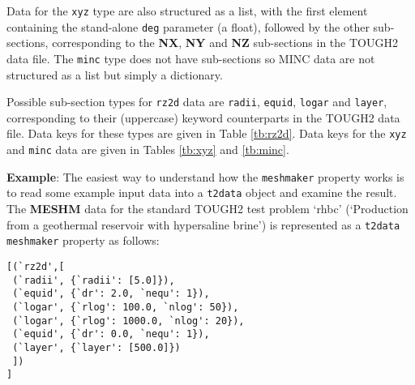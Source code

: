Data for the \texttt{xyz} type are also structured as a list, with the first element containing the stand-alone \texttt{deg} parameter (a float), followed by the other sub-sections, corresponding to the \textbf{NX}, \textbf{NY} and \textbf{NZ} sub-sections in the TOUGH2 data file.  The \texttt{minc} type does not have sub-sections so MINC data are not structured as a list but simply a dictionary.

Possible sub-section types for \texttt{rz2d} data are \texttt{radii}, \texttt{equid}, \texttt{logar} and \texttt{layer}, corresponding to their (uppercase) keyword counterparts in the TOUGH2 data file.  Data keys for these types are given in Table \ref{tb:rz2d}.  Data keys for the \texttt{xyz} and \texttt{minc} data are given in Tables \ref{tb:xyz} and \ref{tb:minc}.

\textbf{Example}: The easiest way to understand how the \texttt{meshmaker} property works is to read some example input data into a \texttt{t2data} object and examine the result.  The \textbf{MESHM} data for the standard TOUGH2 test problem `rhbc' (`Production from a geothermal reservoir with hypersaline brine') is represented as a \texttt{t2data} \texttt{meshmaker} property as follows:

\begin{verbatim}
[(`rz2d',[
 (`radii', {`radii': [5.0]}),
 (`equid', {`dr': 2.0, `nequ': 1}),
 (`logar', {`rlog': 100.0, `nlog': 50}),
 (`logar', {`rlog': 1000.0, `nlog': 20}),
 (`equid', {`dr': 0.0, `nequ': 1}),
 (`layer', {`layer': [500.0]})
 ])
]
\end{verbatim}

